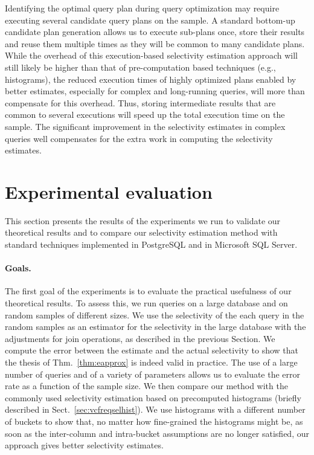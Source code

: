 Identifying the optimal query plan during query optimization may
require executing several candidate query plans on the sample. A standard
bottom-up candidate plan generation allows us to execute sub-plans once, store
their results and reuse them multiple times as they will be common to many
candidate plans. While the overhead of this execution-based selectivity
estimation approach will still likely be higher than that of pre-computation
based techniques (e.g., histograms),  the reduced execution times of highly
optimized plans enabled by better estimates, especially for complex and
long-running queries, will more than compensate for this overhead.   
Thus, storing intermediate results that are common to several executions will speed up
the total execution time on the sample. The significant improvement in the
selectivity estimates in complex queries well compensates for the extra work in
computing the selectivity estimates.

\section{Experimental evaluation}\label{sec:vcfreqexperiments}
This section presents the results of the experiments we run to validate our
theoretical results and to compare our selectivity estimation
method with standard techniques implemented in PostgreSQL and in
Microsoft SQL Server.

\paragraph{Goals.} The first goal of the experiments is to evaluate the practical
usefulness of our theoretical results. To assess this, we run queries on a large
database and on random samples of different sizes. We use the selectivity
of the each query in the random samples as an estimator for the selectivity in
the large database with the adjustments for join operations, as
described in the previous Section. We compute the error between the
estimate and the actual selectivity to show that the thesis of
Thm.~\ref{thm:eapprox} is indeed valid in practice. The use of a large number
of queries and of a variety of parameters allows us to evaluate the error
rate as a function of the sample size. We then compare our
method with the commonly used selectivity estimation based  on precomputed
histograms (briefly described in Sect.~\ref{sec:vcfreqselhist}). We use histograms
with a different number of buckets to show that, no matter how fine-grained the
histograms might be, as soon as the inter-column and intra-bucket assumptions
are no longer satisfied, our approach gives better selectivity
estimates.

